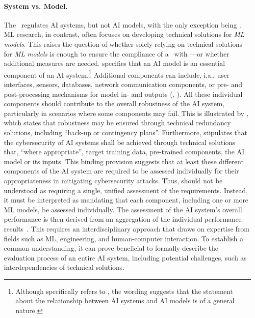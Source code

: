 \paragraph{System vs. Model.}
%
The \EUAIAct\ regulates AI systems, but not AI models, with the only exception being \GPAIMS. 
%
ML research, in contrast, often focuses on developing technical solutions for \emph{ML models}.
%  
This raises the question of whether solely relying on technical solutions for \emph{ML models} is enough to ensure the compliance of a \HRAIS\ with ---or whether additional measures are needed.
%
specifies that an AI model is an essential component of an AI system.\footnote{Although  specifically refers to \GPAIMS, the wording suggests that the statement about the relationship between AI systems and AI models is of a general nature.}
%  
Additional components can include, i.a., user interfaces, sensors, databases, network communication components, or pre- and post-processing mechanisms for model in- and outputs (, \cite{JRC134461}).
% 
All these individual components should contribute to the overall robustness of the AI system, particularly in scenarios where some components may fail.
%
This is illustrated by , which states that robustness may be ensured through technical redundancy solutions, including ``back-up or contingency plans''.
% 
Furthermore,  stipulates that the cybersecurity of AI systems shall be achieved through technical solutions that, ``where appropriate'', target training data, pre-trained components, the AI model or its inputs. 
%
This binding provision suggests that at least these different components of the AI system are required to be assessed individually for their appropriateness in mitigating cybersecurity attacks.
%
Thus,  should not be understood as requiring a single, unified assessment of the requirements. Instead, it must be interpreted as mandating that each component, including one or more ML models, be assessed individually. The assessment of the AI system’s overall performance is then derived from an aggregation of the individual performance results~\cite{kumar2023}. 
%
This requires an interdisciplinary approach that draws on expertise from fields such as ML, engineering, and human-computer interaction.
%
To establish a common understanding, it can prove beneficial to formally describe the evaluation process of an entire AI system, including potential challenges, such as interdependencies of technical solutions. 
%

